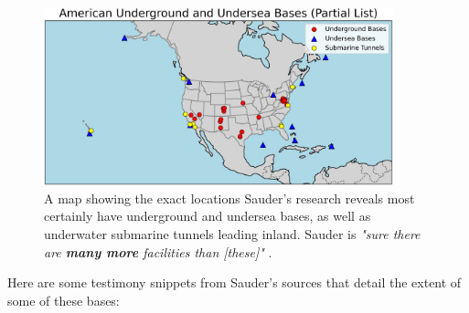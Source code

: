 \documentclass[10pt,twocolumn,letterpaper]{article}
\begin{document}
\begin{figure}[t]
\begin{center}
\includegraphics[width=0.9\textwidth]{basescrop.png}
\end{center}
   \caption{A map showing the exact locations Sauder's research reveals most certainly have underground and undersea bases, as well as underwater submarine tunnels leading inland. Sauder is \textit{"sure there are \textbf{many more} facilities than [these]"} \cite{22}.}
   \label{fig:4}
\end{figure}

Here are some testimony snippets from Sauder's sources that detail the extent of some of these bases:
\end{document}
